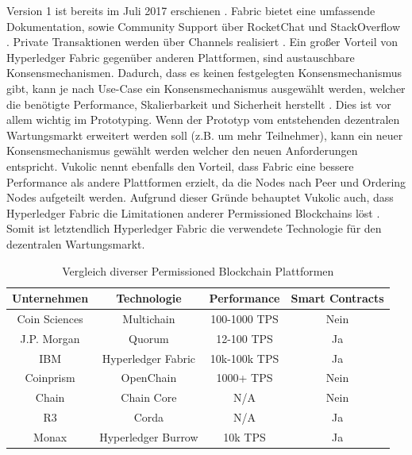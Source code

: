 Version 1 ist bereits im Juli 2017 erschienen \cite{GitHubReleasesHyperledger2018a}. Fabric bietet eine umfassende Dokumentation, sowie Community Support über RocketChat und StackOverflow \cite{HyperledgerFabricDocumentation}\cite{HyperledgerFabricSupport}. Private Transaktionen werden über Channels realisiert \cite{SchererPerformanceScalabilityBlockchain2017}. Ein großer Vorteil von Hyperledger Fabric gegenüber anderen Plattformen, sind austauschbare Konsensmechanismen. Dadurch, dass es keinen festgelegten Konsensmechanismus gibt, kann je nach Use-Case ein Konsensmechanismus ausgewählt werden, welcher die benötigte Performance, Skalierbarkeit und Sicherheit herstellt \cite{VukolicRethinkingPermissionedBlockchains2017}. Dies ist vor allem wichtig im Prototyping. Wenn der Prototyp vom entstehenden dezentralen Wartungsmarkt erweitert werden soll (z.B. um mehr Teilnehmer), kann ein neuer Konsensmechanismus gewählt werden welcher den neuen Anforderungen entspricht. Vukolic nennt ebenfalls den Vorteil, dass Fabric eine bessere Performance als andere Plattformen erzielt, da die Nodes nach Peer und Ordering Nodes aufgeteilt werden. Aufgrund dieser Gründe behauptet Vukolic auch, dass Hyperledger Fabric die Limitationen anderer Permissioned Blockchains löst \cite{VukolicRethinkingPermissionedBlockchains2017}. Somit ist letztendlich Hyperledger Fabric die verwendete Technologie für den dezentralen Wartungsmarkt.

\begin{table}[h]
    \centering
	\begin{tabular}{c c c c}
	\textbf{Unternehmen} & \textbf{Technologie}  & \textbf{Performance} & \textbf{Smart Contracts} \\ \hline
	Coin Sciences & Multichain & 100-1000 TPS & Nein \\ \hline
    J.P. Morgan & Quorum & 12-100 TPS & Ja \\ \hline
    IBM & Hyperledger Fabric & 10k-100k TPS & Ja \\ \hline
    Coinprism & OpenChain & 1000+ TPS & Nein \\ \hline
    Chain & Chain Core & N/A & Nein \\ \hline
    R3 & Corda & N/A & Ja \\ \hline
    Monax & Hyperledger Burrow & 10k TPS & Ja \\
    \end{tabular}
    \caption{Vergleich diverser Permissioned Blockchain Plattformen \cite{BenHamidaBlockchainEnterpriseOverview2017}\cite{GithubHyperledgerBurrow2018}}
	\label{tab:perm-comparison}
\end{table}


